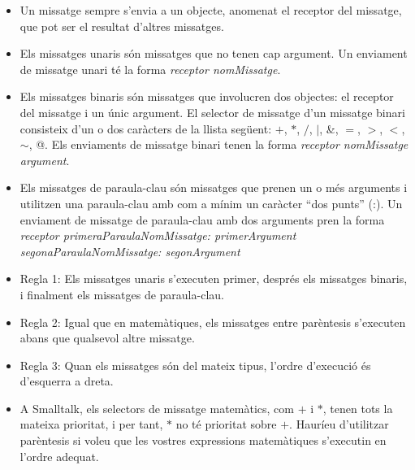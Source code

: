\begin{itemize}
\item Un missatge sempre s'envia a un objecte, anomenat el receptor del missatge, que pot ser el resultat d'altres missatges.
\item Els missatges unaris són missatges que no tenen cap argument. Un enviament de missatge unari té la forma \textsf{{\itshape receptor nomMissatge}}.
\item Els missatges binaris són missatges que involucren dos objectes: el receptor del missatge i un únic argument. El selector de missatge d'un missatge binari consisteix d'un o dos caràcters de la llista següent:  \textsf{$+$}, \textsf{$*$}, \textsf{$/$}, \textsf{$|$}, \textsf{\&}, \textsf{$=$}, \textsf{$>$}, \textsf{$<$}, \textsf{$\sim$}, \textsf{@}. Els enviaments de missatge binari tenen la forma \textsf{{\itshape receptor nomMissatge argument}}.
\item Els missatges de paraula-clau són missatges que prenen un o més arguments i utilitzen una paraula-clau amb
com a mínim un caràcter ``dos punts'' (:). Un enviament de missatge de paraula-clau amb dos arguments pren la forma \textsf{{\itshape receptor primeraParaulaNomMissatge: primerArgument segonaParaulaNomMissatge: segonArgument}}
\item Regla 1: Els missatges unaris s'executen primer, després els missatges binaris, i finalment els missatges de paraula-clau.
\item Regla 2: Igual que en matemàtiques, els missatges entre parèntesis s'executen abans que qualsevol altre missatge.
\item Regla 3: Quan els missatges són del mateix tipus, l'ordre d'execució és d'esquerra a dreta.
\item A Smalltalk, els selectors de missatge matemàtics, com \textsf{$+$} i \textsf{$*$}, tenen tots la mateixa prioritat, i per tant, \textsf{$*$} no té prioritat sobre \textsf{$+$}. Hauríeu d'utilitzar parèntesis si voleu que les vostres expressions matemàtiques s'executin en l'ordre adequat.
\end{itemize}

